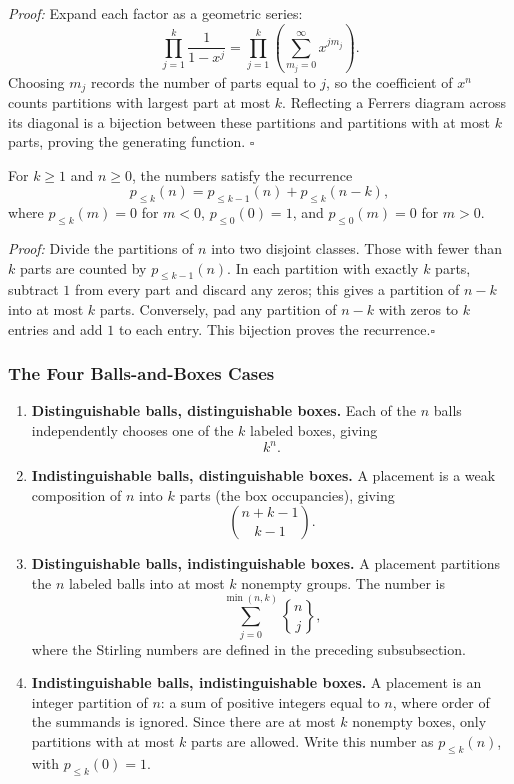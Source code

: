 \documentclass[a4paper,11pt,abstracton]{scrartcl}
\newcommand{\genstirlingII}[3]{%
  \genfrac{\{}{\}}{0pt}{#1}{#2}{#3}%
}
\newcommand{\stirlingII}[2]{\genstirlingII{}{#1}{#2}}
\theoremstyle{dotlessP}
\theoremstyle{dotlessS}
\theoremstyle{remark}
\theoremstyle{definition}
\begin{document}
\begin{claim_box}
\textit{Proof:} Expand each factor as a geometric series:
\[
  \prod_{j=1}^{k}\frac{1}{1-x^j}
  =\prod_{j=1}^{k}\left(\sum_{m_j=0}^{\infty}x^{jm_j}\right).
\]
Choosing $m_j$ records the number of parts equal to $j$, so the coefficient of $x^n$ counts partitions with largest part at most $k$. Reflecting a Ferrers diagram across its diagonal is a bijection between these partitions and partitions with at most $k$ parts, proving the generating function.
\hfill$\square$
\end{claim_box}

For $k\geq1$ and $n\geq0$, the numbers satisfy the recurrence
\[
  p_{\leq k}(n)=p_{\leq k-1}(n)+p_{\leq k}(n-k),
\]
where $p_{\leq k}(m)=0$ for $m<0$, $p_{\leq 0}(0)=1$, and $p_{\leq 0}(m)=0$ for $m>0$.
\begin{claim_box}
\textit{Proof:} Divide the partitions of $n$ into two disjoint classes. Those with fewer than $k$ parts are counted by $p_{\leq k-1}(n)$. In each partition with exactly $k$ parts, subtract $1$ from every part and discard any zeros; this gives a partition of $n-k$ into at most $k$ parts. Conversely, pad any partition of $n-k$ with zeros to $k$ entries and add $1$ to each entry. This bijection proves the recurrence.\hfill$\square$
\end{claim_box}

\subsubsection{The Four Balls-and-Boxes Cases}

\begin{problem_box}
\begin{enumerate}
  \item \textbf{Distinguishable balls, distinguishable boxes.} Each of the $n$ balls independently chooses one of the $k$ labeled boxes, giving
  \[
    k^n.
  \]
  \item \textbf{Indistinguishable balls, distinguishable boxes.} A placement is a weak composition of $n$ into $k$ parts (the box occupancies), giving
  \[
    \binom{n+k-1}{k-1}.
  \]
  \item \textbf{Distinguishable balls, indistinguishable boxes.} A placement partitions the $n$ labeled balls into at most $k$ nonempty groups. The number is
  \[
    \sum_{j=0}^{\min(n,k)}\stirlingII{n}{j},
  \]
  where the Stirling numbers are defined in the preceding subsubsection.
  \item \textbf{Indistinguishable balls, indistinguishable boxes.} A placement is an integer partition of $n$: a sum of positive integers equal to $n$, where order of the summands is ignored. Since there are at most $k$ nonempty boxes, only partitions with at most $k$ parts are allowed. Write this number as $p_{\leq k}(n)$, with $p_{\leq k}(0)=1$.
\end{enumerate}
\end{problem_box}
\end{document}
